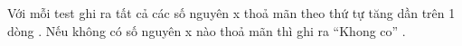 Với mỗi test ghi ra tất cả các số nguyên x thoả mãn theo thứ tự tăng dần trên 1 dòng . Nếu không có số nguyên x nào thoả mãn thì ghi ra “Khong co” .  

\